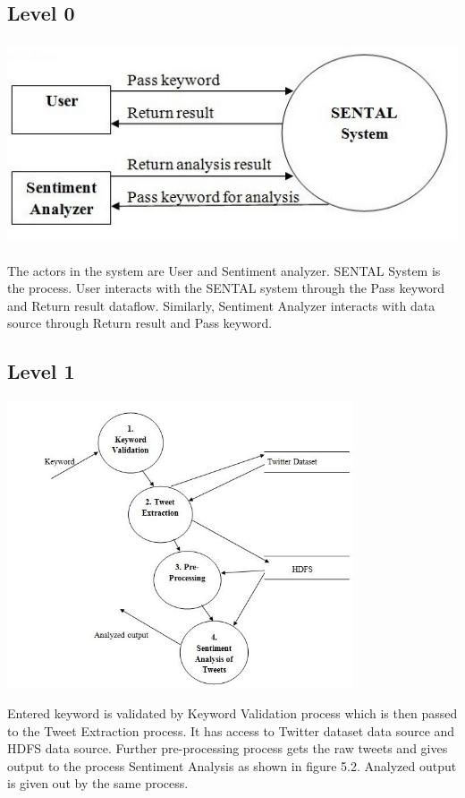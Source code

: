\documentclass[a4paper,12pt]{report}
\begin{document}
\subsection{Level 0}
\begin{center}
	\includegraphics[height=6cm]{images/DFD1.jpg}
\end{center}
\hspace*{\parindent}The actors in the system are User and Sentiment analyzer. SENTAL System is the process. User interacts with the SENTAL system through the Pass keyword and Return result dataflow. Similarly, Sentiment Analyzer interacts with data source through Return result and Pass keyword.
\subsection{Level 1}
\begin{center}
	\includegraphics[height=8.5cm]{images/Dfd_level1.jpg}
\end{center}
\hspace*{\parindent}Entered keyword is validated by Keyword Validation process which is then passed to the Tweet Extraction process. It has access to Twitter dataset data source and HDFS data source. Further pre-processing process gets the raw tweets and gives output to the process Sentiment Analysis as shown in figure 5.2. Analyzed output is given out by the same process.
\end{document}
